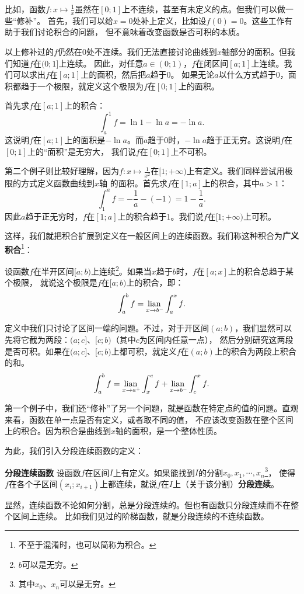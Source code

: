 \documentclass[12pt,UTF8]{ctexbook}
\begin{document}
比如，函数$f: x\mapsto\frac{1}{x}$虽然在$[0;1]$上不连续，甚至有未定义的点。但我们可以做一些“修补”。
首先，我们可以给$x=0$处补上定义，比如设$f(0) = 0$。这些工作有助于我们讨论积合的问题，
但不意味着改变函数是否可积的本质。

以上修补过的$f$仍然在$0$处不连续。我们无法直接讨论曲线到$x$轴部分的面积。但我们知道$f$在$(0;1]$上连续。
因此，对任意$a\in(0;1)$，$f$在闭区间$[a;1]$上连续。我们可以求出$f$在$[a;1]$上的面积，然后把$a$趋于$0$。
如果无论$a$以什么方式趋于$0$，面积都趋于一个极限，就定义这个极限为$f$在$[0;1]$上的面积。

首先求$f$在$[a;1]$上的积合：
$$ \int_a^1 f = \ln{1} - \ln{a} = -\ln{a}. $$
这说明$f$在$[a;1]$上的面积是$-\ln{a}$。而$a$趋于$0$时，$-\ln{a}$趋于正无穷。这说明$f$在$[0;1]$上的“面积”是无穷大，
我们说$f$在$[0;1]$上不可积。

第二个例子则比较好理解，因为$f:x\mapsto \frac{1}{x^2}$在$[1;+\infty)$上有定义。我们同样尝试用极限的方式定义函数曲线到$x$轴
的面积。首先求$f$在$[1;a]$上的积合，其中$a>1$：
$$ \int_1^a f = -\frac{1}{a} - (-1) = 1 - \frac{1}{a}. $$
因此$a$趋于正无穷时，$f$在$[1;a]$上的积合趋于$1$。我们说$f$在$[1;+\infty)$上可积。

这样，我们就把积合扩展到定义在一般区间上的连续函数。我们称这种积合为\textbf{广义积合}\footnote{不至于混淆时，也可以简称为积合。}：
\begin{df}
    设函数$f$在半开区间$[a;b)$上连续\footnote{$b$可以是无穷。}。如果当$x$趋于$b$时，$f$在$[a;x]$上的积合总趋于某个极限，
    就说这个极限是$f$在$[a;b)$上的积合，即：
    $$ \int_a^b f = \underset{x\to b^-}{\operatorname{lian}\,} \int_a^x f. $$
\end{df}

定义中我们只讨论了区间一端的问题。不过，对于开区间$(a;b)$，我们显然可以先将它截为两段：$(a;c]$、$[c;b)$（其中$c$为区间内任意一点），
然后分别研究这两段是否可积。如果在$(a;c]$、$[c;b)$上都可积，就定义$f$在$(a;b)$上的积合为两段上积合的和。
$$ \int_a^b f = \underset{x\to a^+}{\operatorname{lian}\,} \int_x^c f + \underset{x\to b^-}{\operatorname{lian}\,} \int_c^x f. $$ 

第一个例子中，我们还“修补”了另一个问题，就是函数在特定点的值的问题。直观来看，函数在单一点是否有定义，或者取不同的值，
不应该改变函数在整个区间上的积合。因为积合是曲线到$x$轴的面积，是一个整体性质。

为此，我们引入分段连续函数的定义：
\begin{df}{\textbf{分段连续函数}}
    设函数$f$在区间$I$上有定义。如果能找到$I$的分割$x_0, x_1, \cdots, x_n$\footnote{其中$x_0$、$x_n$可以是无穷。}，
    使得$f$在各个子区间$(x_i;x_{i+1})$上都连续，就说$f$在$I$上（关于该分割）\textbf{分段连续}。
\end{df}
显然，连续函数不论如何分割，总是分段连续的。但也有函数只分段连续而不在整个区间上连续。
比如我们见过的阶梯函数，就是分段连续的不连续函数。
\end{document}
